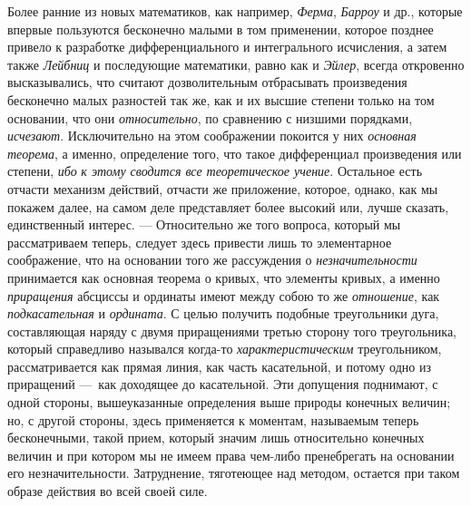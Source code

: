 Более ранние из новых математиков, как например,
{\em Ферма}, {\em Барроу} и др.,
которые впервые пользуются бесконечно малыми в том применении, которое
позднее привело к разработке дифференциального и интегрального исчисления, а
затем также {\em Лейбниц} и последующие математики,
равно как и {\em Эйлер}, всегда откровенно
высказывались, что считают дозволительным отбрасывать произведения
бесконечно малых разностей так же, как и их высшие степени только на том
основании, что они {\em относительно}, по сравнению с
низшими порядками, {\em исчезают}. Исключительно на
этом соображении покоится у них {\em основная теорема},
а именно, определение того, что такое дифференциал произведения или степени,
{\em ибо }{\em к этому сводится все
теоретическое учение}. Остальное есть отчасти механизм действий, отчасти же
приложение, которое, однако, как мы покажем далее, на самом деле
представляет более высокий или, лучше сказать, единственный интерес. —
Относительно же того вопроса, который мы рассматриваем теперь, следует
здесь привести лишь то элементарное соображение, что на основании того же
рассуждения о {\em незначительности} принимается как
основная теорема о кривых, что элементы кривых, а именно
{\em приращения} абсциссы и ординаты имеют между собою
то же {\em отношение}, как
{\em подкасательная} и
{\em ордината}. С целью получить подобные треугольники
дуга, составляющая наряду с двумя приращениями третью сторону того
треугольника, который справедливо назывался когда-то
{\em характеристическим} треугольником, рассматривается
как прямая линия, как часть касательной, и потому одно из приращений —~как
доходящее до касательной. Эти допущения поднимают, с одной стороны,
вышеуказанные определения выше природы конечных величин; но, с другой
стороны, здесь применяется к моментам, называемым теперь бесконечными,
такой прием, который значим лишь относительно конечных величин и при
котором мы не имеем права чем-либо пренебрегать на основании его
незначительности. Затруднение, тяготеющее над методом, остается при таком
образе действия во всей своей силе.

